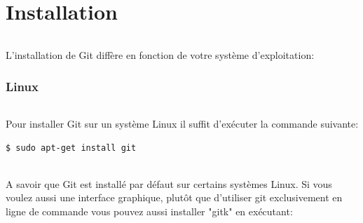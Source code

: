 \documentclass[french, a4paper, 12pt, titlepage]{article}
\begin{document}
%
%
%

\newpage
\part{Installation}
\paragraph{}L'installation de Git diffère en fonction de votre système d'exploitation:
\section{Linux}
\paragraph{} Pour installer Git sur un système Linux il suffit d'exécuter la commande suivante:

\begin{lstlisting}
$ sudo apt-get install git
\end{lstlisting}

\paragraph{} A savoir que Git est installé par défaut sur certains systèmes
Linux. Si vous voulez aussi une interface graphique, plutôt que d'utiliser git
exclusivement en ligne de commande vous pouvez aussi installer "gitk" en
exécutant:
\end{document}
